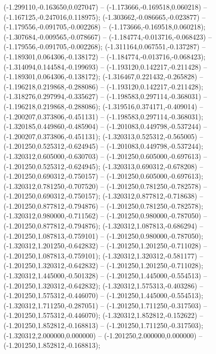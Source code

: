  (-1.299110,-0.163650,0.027047) -- (-1.173666,-0.169518,0.060218) -- (-1.167125,-0.247016,0.118975);
 (-1.303662,-0.086665,-0.023877) -- (-1.179556,-0.091705,-0.002268) -- (-1.173666,-0.169518,0.060218);
 (-1.307684,-0.009565,-0.078667) -- (-1.184774,-0.013716,-0.068423) -- (-1.179556,-0.091705,-0.002268);
 (-1.311164,0.067551,-0.137287) -- (-1.189301,0.064306,-0.138172) -- (-1.184774,-0.013716,-0.068423);
 (-1.314094,0.144584,-0.199693) -- (-1.193120,0.142217,-0.211428) -- (-1.189301,0.064306,-0.138172);
 (-1.316467,0.221432,-0.265828) -- (-1.196218,0.219868,-0.288086) -- (-1.193120,0.142217,-0.211428);
 (-1.318276,0.297994,-0.335627) -- (-1.198583,0.297114,-0.368031) -- (-1.196218,0.219868,-0.288086);
 (-1.319516,0.374171,-0.409014) -- (-1.200207,0.373806,-0.451131) -- (-1.198583,0.297114,-0.368031);
 (-1.320185,0.449860,-0.485904) -- (-1.201083,0.449798,-0.537244) -- (-1.200207,0.373806,-0.451131);
 (-1.320313,0.525312,-0.565005) -- (-1.201250,0.525312,-0.624945) -- (-1.201083,0.449798,-0.537244);
 (-1.320312,0.605000,-0.630703) -- (-1.201250,0.605000,-0.697613) -- (-1.201250,0.525312,-0.624945);
 (-1.320313,0.690312,-0.678208) -- (-1.201250,0.690312,-0.750157) -- (-1.201250,0.605000,-0.697613);
 (-1.320312,0.781250,-0.707520) -- (-1.201250,0.781250,-0.782578) -- (-1.201250,0.690312,-0.750157);
 (-1.320312,0.877812,-0.718638) -- (-1.201250,0.877812,-0.794876) -- (-1.201250,0.781250,-0.782578);
 (-1.320312,0.980000,-0.711562) -- (-1.201250,0.980000,-0.787050) -- (-1.201250,0.877812,-0.794876);
 (-1.320312,1.087813,-0.686294) -- (-1.201250,1.087813,-0.759101) -- (-1.201250,0.980000,-0.787050);
 (-1.320312,1.201250,-0.642832) -- (-1.201250,1.201250,-0.711028) -- (-1.201250,1.087813,-0.759101);
 (-1.320312,1.320312,-0.581177) -- (-1.201250,1.320312,-0.642832) -- (-1.201250,1.201250,-0.711028);
 (-1.320312,1.445000,-0.501328) -- (-1.201250,1.445000,-0.554513) -- (-1.201250,1.320312,-0.642832);
 (-1.320312,1.575313,-0.403286) -- (-1.201250,1.575312,-0.446070) -- (-1.201250,1.445000,-0.554513);
 (-1.320312,1.711250,-0.287051) -- (-1.201250,1.711250,-0.317503) -- (-1.201250,1.575312,-0.446070);
 (-1.320312,1.852812,-0.152622) -- (-1.201250,1.852812,-0.168813) -- (-1.201250,1.711250,-0.317503);
 (-1.320312,2.000000,0.000000) -- (-1.201250,2.000000,0.000000) -- (-1.201250,1.852812,-0.168813);
